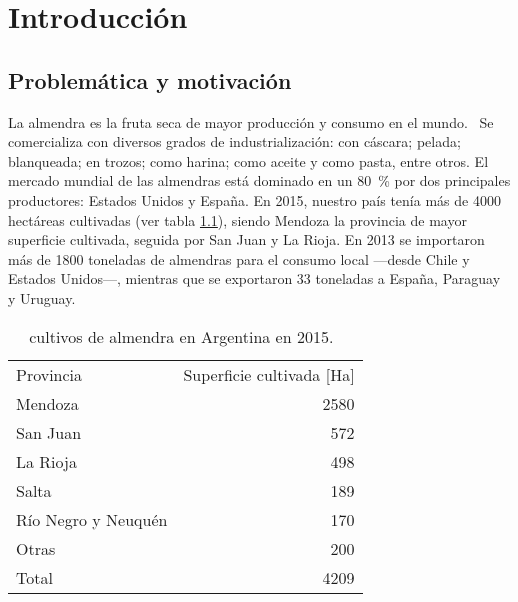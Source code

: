 \chapter{Introducción}



\section{Problemática y motivación}

La almendra es la fruta seca de mayor producción y consumo en el mundo.~\autocite{iannamico:frutossecos} Se comercializa con diversos grados de industrialización: con cáscara; pelada; blanqueada; en trozos; como harina; como aceite y como pasta, entre otros. El mercado mundial de las almendras está dominado en un \SI{80}{\percent} por dos principales productores: Estados Unidos y España. En \num{2015}, nuestro país tenía más de \num{4000} hectáreas cultivadas (ver tabla \ref{tabla:supcultivada}), siendo Mendoza la provincia de mayor superficie cultivada, seguida por San Juan y La Rioja. En \num{2013} se importaron más de \num{1800} toneladas de almendras para el consumo local —desde Chile y Estados Unidos—, mientras que se exportaron \num{33} toneladas a España, Paraguay y Uruguay.~\autocite{faostat}


\begin{table}[hbt]
\centering
\caption[Cultivos de almendra en Argentina en 2015]{cultivos de almendra en Argentina en 2015.~\autocite{iannamico:cultivo}}
\label{tabla:supcultivada}
\begin{tabular}{@{}lr@{}}
\toprule
Provincia           & Superficie cultivada {[}Ha{]} \\ \cmidrule{1-2} %
Mendoza             & 2580                          \\
San Juan            & 572                           \\
La Rioja            & 498                           \\
Salta               & 189                           \\
Río Negro y Neuquén & 170                           \\
Otras               & 200                           \\
Total               & 4209                          \\ \bottomrule
\end{tabular}
\end{table}



